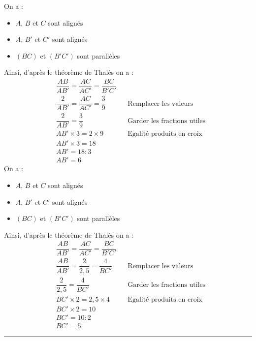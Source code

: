   \begin{multicols}{2}
    \exo{}{} On a :
    \begin{itemize}
      \item $A$, $B$ et $C$ sont alignés
      \item $A$, $B'$ et $C'$ sont alignés
      \item $(BC)$ et $(B'C')$ sont parallèles
    \end{itemize}
    Ainsi, d'après le théorème de Thalès on a :
    \begin{align*}
      &\dfrac{AB}{AB'}=\dfrac{AC}{AC'}=\dfrac{BC}{B'C'}&&\\
      &\dfrac{2}{AB'}=\dfrac{AC}{AC'}=\dfrac{3}{9}&&\text{Remplacer les valeurs}\\
      &\dfrac{2}{AB'}=\dfrac{3}{9}&&\text{Garder les fractions utiles}\\
      &AB'\times 3=2\times 9 &&\text{Egalité produits en croix}\\
      &AB'\times 3=18&&\\
      &AB'=18:3&&\\
      &AB'=6&&
    \end{align*}
    \exo{}{} On a :
    \vspace{-1em} %
    \begin{itemize}
      \item $A$, $B$ et $C$ sont alignés
      \item $A$, $B'$ et $C'$ sont alignés
      \item $(BC)$ et $(B'C')$ sont parallèles
    \end{itemize}
    Ainsi, d'après le théorème de Thalès on a :
    \begin{align*}
      &\dfrac{AB}{AB'}=\dfrac{AC}{AC'}=\dfrac{BC}{B'C'}&&\\
      &\dfrac{AB}{AB'}=\dfrac{2}{2,5}=\dfrac{4}{BC'}&&\text{Remplacer les valeurs}\\
      &\dfrac{2}{2,5}=\dfrac{4}{BC'} &&\text{Garder les fractions utiles}\\
      &BC'\times 2=2,5\times 4&&\text{Egalité produits en croix}\\
      &BC'\times 2=10 &&\\
      &BC'=10:2 &&\\
      &BC'=5
    \end{align*}
  \end{multicols}
  \hrule \vspace{-0.5em}
